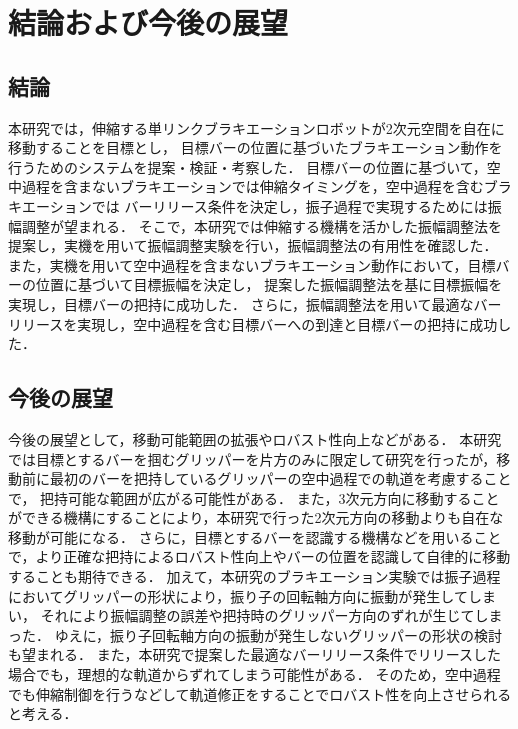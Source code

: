 \chapter[結論および今後の展望]%
{結論および今後の展望}
        \section{結論}

        本研究では，伸縮する単リンクブラキエーションロボットが2次元空間を自在に移動することを目標とし，
        目標バーの位置に基づいたブラキエーション動作を行うためのシステムを提案・検証・考察した．
        目標バーの位置に基づいて，空中過程を含まないブラキエーションでは伸縮タイミングを，空中過程を含むブラキエーションでは
        バーリリース条件を決定し，振子過程で実現するためには振幅調整が望まれる．
        そこで，本研究では伸縮する機構を活かした振幅調整法を提案し，実機を用いて振幅調整実験を行い，振幅調整法の有用性を確認した．
        また，実機を用いて空中過程を含まないブラキエーション動作において，目標バーの位置に基づいて目標振幅を決定し，
        提案した振幅調整法を基に目標振幅を実現し，目標バーの把持に成功した．
        さらに，振幅調整法を用いて最適なバーリリースを実現し，空中過程を含む目標バーへの到達と目標バーの把持に成功した．
       

          

        \section{今後の展望}
        
        今後の展望として，移動可能範囲の拡張やロバスト性向上などがある．
        本研究では目標とするバーを掴むグリッパーを片方のみに限定して研究を行ったが，移動前に最初のバーを把持しているグリッパーの空中過程での軌道を考慮することで，
        把持可能な範囲が広がる可能性がある．
        また，3次元方向に移動することができる機構にすることにより，本研究で行った2次元方向の移動よりも自在な移動が可能になる．
        さらに，目標とするバーを認識する機構などを用いることで，より正確な把持によるロバスト性向上やバーの位置を認識して自律的に移動することも期待できる．
        加えて，本研究のブラキエーション実験では振子過程においてグリッパーの形状により，振り子の回転軸方向に振動が発生してしまい，
        それにより振幅調整の誤差や把持時のグリッパー方向のずれが生じてしまった．
        ゆえに，振り子回転軸方向の振動が発生しないグリッパーの形状の検討も望まれる．
        また，本研究で提案した最適なバーリリース条件でリリースした場合でも，理想的な軌道からずれてしまう可能性がある．
        そのため，空中過程でも伸縮制御を行うなどして軌道修正をすることでロバスト性を向上させられると考える．
